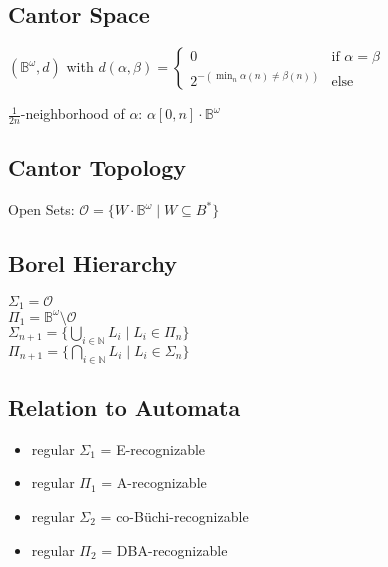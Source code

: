 \documentclass{article}
\begin{document}
\subsection*{Cantor Space}
$(\mathbb{B}^\omega, d)$ with $d(\alpha, \beta) = \begin{cases} 0 & \text{if } \alpha = \beta \\ 2^{-(\min_n \alpha(n) \neq \beta(n))} & \text{else}  \end{cases}$

$\frac{1}{2n}$-neighborhood of $\alpha$: $\alpha[0, n] \cdot \mathbb{B}^\omega$

\subsection*{Cantor Topology}
Open Sets: $\mathcal{O} = \{W \cdot \mathbb{B}^\omega \mid W \subseteq B^*\}$

\subsection*{Borel Hierarchy}
$\Sigma_1 = \mathcal{O}$ \\
$\Pi_1 = \mathbb{B}^\omega \setminus \mathcal{O}$ \\
$\Sigma_{n+1} = \{ \bigcup_{i \in \mathbb{N}} L_i \mid L_i \in \Pi_n \}$ \\
$\Pi_{n+1} = \{ \bigcap_{i \in \mathbb{N}} L_i \mid L_i \in \Sigma_n \}$

\subsection*{Relation to Automata}
\begin{itemize}
	\item regular $\Sigma_1$ = E-recognizable
	\item regular $\Pi_1$ = A-recognizable
	\item regular $\Sigma_2$ = co-Büchi-recognizable
	\item regular $\Pi_2$ = DBA-recognizable
\end{itemize}
\end{document}
